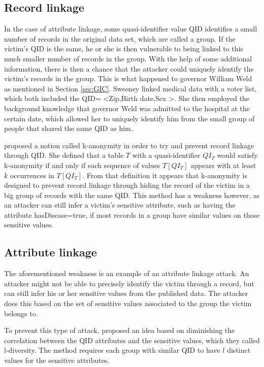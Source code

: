 \subsection{Record linkage}
In the case of attribute linkage, some quasi-identifier value QID identifies a small number of records in the original data set, which are called a group. If the victim's QID is the same, he or she is then vulnerable to being linked to this much smaller number of records in the group. With the help of some additional information, there is then a chance that the attacker could uniquely identify the victim's records in the group. This is what happened to governor William Weld as mentioned in Section \ref{sec:GIC}. Sweeney linked medical data with a voter list, which both included the QID= \textless Zip,Birth date,Sex \textgreater. She then employed the background knowledge that governor Weld was admitted to the hospital at the certain date, which allowed her to uniquely identify him from the small group of people that shared the same QID as him. 

\cite{sweeney2002k} proposed a notion called k-anonymity in order to try and prevent record linkage through QID. She defined that a table $T$ with a quasi-identifier $QI_T$ would satisfy k-anonymity if and only if each sequence of values $T[QI_T]$ appears with at least $k$ occurrences in $T[QI_T]$. From that definition it appears that k-anonymity is designed to prevent record linkage through hiding the record of the victim in a big group of records with the same QID. This method has a weakness however, as an attacker can still infer a victim's sensitive attribute, such as having the attribute hasDisease=true, if most records in a group have similar values on those sensitive values. 

\subsection{Attribute linkage}
The aforementioned weakness is an example of an attribute linkage attack. An attacker might not be able to precisely identify the victim through a record, but can still infer his or her sensitive values from the published data. The attacker does this based on the set of sensitive values associated to the group the victim belongs to. 

To prevent this type of attack,\cite{machanavajjhala2007diversity} proposed an idea based on diminishing the correlation between the QID attributes and the sensitive values, which they called l-diversity. The method requires each group with similar QID to have $l$ distinct values for the sensitive attributes. 


